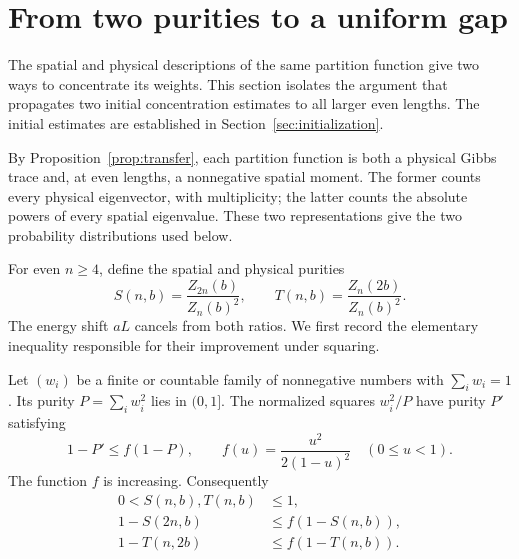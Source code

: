 \section{From two purities to a uniform gap}\label{sec:bootstrap}

The spatial and physical descriptions of the same partition function
give two ways to concentrate its weights.  This section isolates the
argument that propagates two initial concentration estimates to all
larger even lengths.  The initial estimates are established in
Section~\ref{sec:initialization}.

By Proposition~\ref{prop:transfer}, each partition function is both a
physical Gibbs trace and, at even lengths, a nonnegative spatial moment.
The former counts every physical eigenvector, with multiplicity; the
latter counts the absolute powers of every spatial eigenvalue. These
two representations give the two probability distributions used below.

For even $n\ge4$, define the spatial and physical purities
\begin{equation}\label{eq:purities}
 S(n,b)=\frac{Z_{2n}(b)}{Z_n(b)^2},\qquad
 T(n,b)=\frac{Z_n(2b)}{Z_n(b)^2}.
\end{equation}
The energy shift $aL$ cancels from both ratios.  We first record the
elementary inequality responsible for their improvement under squaring.

\begin{lemma}\label{lem:purity}
Let $(w_i)$ be a finite or countable family of nonnegative numbers with
$\sum_iw_i=1$. Its purity $P=\sum_iw_i^2$ lies in $(0,1]$.
The normalized squares $w_i^2/P$ have purity $P'$ satisfying
\begin{equation}\label{eq:purity-square}
 1-P'\le f(1-P),\qquad
 f(u)=\frac{u^2}{2(1-u)^2}\quad(0\le u<1).
\end{equation}
The function $f$ is increasing.  Consequently
\begin{equation}\label{eq:two-squarings}
 \begin{split}
 0<S(n,b),T(n,b)&\le1,\\
 1-S(2n,b)&\le f(1-S(n,b)),\\
 1-T(n,2b)&\le f(1-T(n,b)).
 \end{split}
\end{equation}
\end{lemma}

